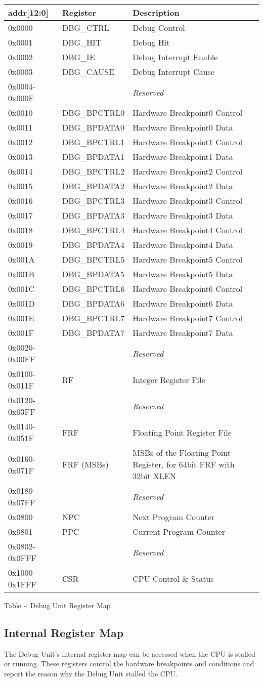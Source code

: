 \begin{longtable}[]{@{}lll@{}}
\toprule
addr{[}12:0{]} & Register & Description\tabularnewline
\midrule
\endhead
0x0000 & DBG\_CTRL & Debug Control\tabularnewline
0x0001 & DBG\_HIT & Debug Hit\tabularnewline
0x0002 & DBG\_IE & Debug Interrupt Enable\tabularnewline
0x0003 & DBG\_CAUSE & Debug Interrupt Cause\tabularnewline
0x0004-0x000F & & \emph{Reserved}\tabularnewline
0x0010 & DBG\_BPCTRL0 & Hardware Breakpoint0 Control\tabularnewline
0x0011 & DBG\_BPDATA0 & Hardware Breakpoint0 Data\tabularnewline
0x0012 & DBG\_BPCTRL1 & Hardware Breakpoint1 Control\tabularnewline
0x0013 & DBG\_BPDATA1 & Hardware Breakpoint1 Data\tabularnewline
0x0014 & DBG\_BPCTRL2 & Hardware Breakpoint2 Control\tabularnewline
0x0015 & DBG\_BPDATA2 & Hardware Breakpoint2 Data\tabularnewline
0x0016 & DBG\_BPCTRL3 & Hardware Breakpoint3 Control\tabularnewline
0x0017 & DBG\_BPDATA3 & Hardware Breakpoint3 Data\tabularnewline
0x0018 & DBG\_BPCTRL4 & Hardware Breakpoint4 Control\tabularnewline
0x0019 & DBG\_BPDATA4 & Hardware Breakpoint4 Data\tabularnewline
0x001A & DBG\_BPCTRL5 & Hardware Breakpoint5 Control\tabularnewline
0x001B & DBG\_BPDATA5 & Hardware Breakpoint5 Data\tabularnewline
0x001C & DBG\_BPCTRL6 & Hardware Breakpoint6 Control\tabularnewline
0x001D & DBG\_BPDATA6 & Hardware Breakpoint6 Data\tabularnewline
0x001E & DBG\_BPCTRL7 & Hardware Breakpoint7 Control\tabularnewline
0x001F & DBG\_BPDATA7 & Hardware Breakpoint7 Data\tabularnewline
0x0020-0x00FF & & \emph{Reserved}\tabularnewline
0x0100-0x011F & RF & Integer Register File\tabularnewline
0x0120-0x03FF & & \emph{Reserved}\tabularnewline
0x0140-0x051F & FRF & Floating Point Register File\tabularnewline
0x0160-0x071F & FRF (MSBs) & MSBs of the Floating Point Register, for
64bit FRF with 32bit XLEN\tabularnewline
0x0180-0x07FF & & \emph{Reserved}\tabularnewline
0x0800 & NPC & Next Program Counter\tabularnewline
0x0801 & PPC & Current Program Counter\tabularnewline
0x0802-0x0FFF & & \emph{Reserved}\tabularnewline
0x1000-0x1FFF & CSR & CPU Control \& Status\tabularnewline
\bottomrule
\end{longtable}

Table ‑: Debug Unit Register Map

\subsection{Internal Register Map}\label{internal-register-map}

The Debug Unit's internal register map can be accessed when the CPU is
stalled or running. These registers control the hardware breakpoints and
conditions and report the reason why the Debug Unit stalled the CPU.

